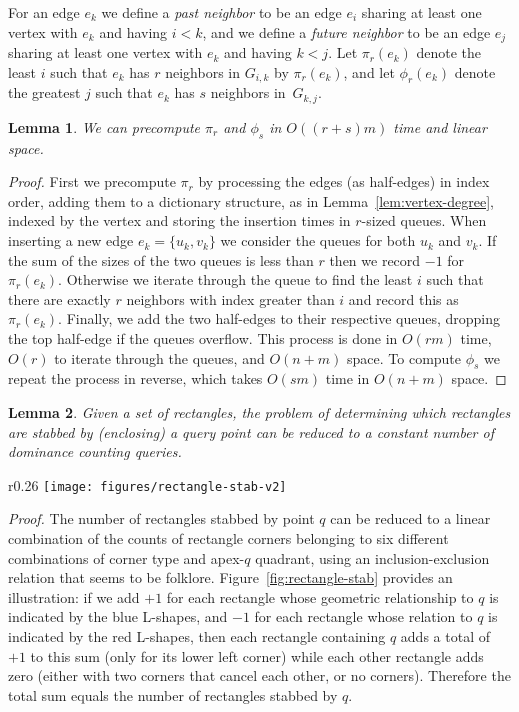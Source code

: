 \documentclass[11pt]{article}
\newtheorem{lemma}{Lemma}
\begin{document}
For an edge $e_k$ we define a \emph{past neighbor} to be an edge $e_i$ sharing at least one vertex with $e_k$  and having $i < k$, and we define a \emph{future neighbor} to be an edge $e_j$ sharing at least one vertex with $e_k$ and having $k < j$. Let $\pi_r(e_k)$ denote the least $i$ such that $e_k$ has $r$ neighbors in $G_{i,k}$ by $\pi_r(e_k)$, and let $\phi_r(e_k)$ denote the greatest $j$ such that $e_k$ has $s$ neighbors in~$G_{k,j}$.

\begin{lemma}
We can precompute $\pi_r$ and $\phi_s$ in $O((r+s)m)$ time and linear space.
\end{lemma}
\begin{proof}
First we precompute $\pi_r$ by processing the edges (as half-edges) in index order, adding them to a dictionary structure, as in Lemma~\ref{lem:vertex-degree}, indexed by the vertex and storing the insertion times in $r$-sized queues. When inserting a new edge $e_k = \{u_k, v_k\}$ we consider the queues for both $u_k$ and $v_k$. If the sum of the sizes of the two queues is less than $r$ then we record $-1$ for $\pi_r(e_k)$. Otherwise we iterate through the queue to find the least $i$ such that there are exactly $r$ neighbors with index greater than $i$ and record this as $\pi_r(e_k)$. Finally, we add the two half-edges to their respective queues, dropping the top half-edge if the queues overflow. This process is done in $O(rm)$ time, $O(r)$ to iterate through the queues, and $O(n + m)$ space. To compute $\phi_s$ we repeat the process in reverse, which takes $O(sm)$ time in $O(n+m)$ space.
\end{proof}

\begin{lemma}\label{lem:rectangle-stabbing}
Given a set of rectangles, the problem of determining which rectangles are stabbed by (enclosing) a query point can be reduced to a constant number of dominance counting queries.
\end{lemma}

\begin{wrapfigure}[13]{r}{0.26\textwidth}
\vspace{-1em}
\centering
\texttt{[image: figures/rectangle-stab-v2]}
\vspace{-1em}
\caption{Turning stabbing into dominance.}
\label{fig:rectangle-stab}
\vspace{-2em}
\end{wrapfigure}
\noindent\emph{Proof.}
The number of rectangles stabbed by point $q$ can be reduced to a linear combination of the counts of rectangle corners belonging to six different combinations of  corner type and apex-$q$ quadrant, using an inclusion-exclusion relation that seems to be folklore.
Figure~\ref{fig:rectangle-stab} provides an illustration: if we add $+1$ for each rectangle whose geometric relationship to $q$ is indicated by the blue L-shapes, and $-1$ for each rectangle whose relation to $q$ is indicated by the red L-shapes, then each rectangle containing $q$ adds a total of $+1$ to this sum (only for its lower left corner) while each other rectangle adds zero (either with two corners that cancel each other, or no corners). Therefore the total sum equals the number of rectangles stabbed by $q$.
\end{document}
